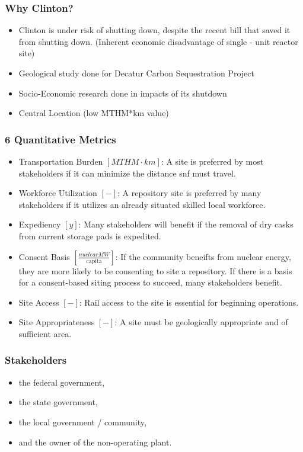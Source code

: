 \begin{frame}
	\frametitle{Why Clinton?}
	\begin{itemize}
		\item Clinton is under risk of shutting down, despite the recent bill that saved
		it from shutting down. (Inherent economic disadvantage of single - unit reactor site)
		\item Geological study done for Decatur Carbon Sequestration Project
		\item Socio-Economic research done in impacts of its shutdown
		\item Central Location (low MTHM*km value)
	\end{itemize}
\end{frame}

\begin{frame}
	\frametitle{6 Quantitative Metrics}
	\begin{itemize}
			\item Transportation Burden $[MTHM \cdot km]$: A site is preferred by 
			most stakeholders if it can minimize the distance snf 
			must travel.
			\item Workforce Utilization $[-]$: A repository site is preferred by 
			many stakeholders if it utilizes an already situated skilled local 
			workforce. 
			\item Expediency $[y]$: Many stakeholders will benefit if the removal 
			of dry casks from current storage pads is expedited.
			\item Consent Basis $[\frac{nuclear MW}{\mbox{capita}}]$: If the community
			beneifts from nuclear energy, they are more likely to be consenting to
			site a repository. If there is a basis for a consent-based 
			siting process to succeed, many stakeholders benefit.
			\item Site Access $[-]$: Rail access to the site is essential for 
			beginning operations.
			\item Site Appropriateness $[-]$: A site must be geologically 
			appropriate and of sufficient area.
	\end{itemize}

\end{frame}

\begin{frame}
	\frametitle{Stakeholders}
	\begin{itemize}
		\item the federal government,
		\item the state government,
		\item the local government / community,
		\item and the owner of the non-operating plant.
	\end{itemize}
\end{frame}


